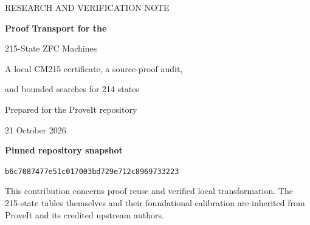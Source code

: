 \documentclass[11pt,letterpaper]{article}
\theoremstyle{definition}
\begin{document}
\begin{titlepage}
\vspace*{0.5in}
{\sffamily\large\color{teal}RESEARCH AND VERIFICATION NOTE\par}
\vspace{0.3in}
{\sffamily\bfseries\Huge\color{navy}Proof Transport for the\par
215-State ZFC Machines\par}
\vspace{0.25in}
{\Large A local CM215 certificate, a source-proof audit,\par
and bounded searches for 214 states\par}
\vspace{0.4in}
{\large Prepared for the ProveIt repository\par}
{\large 21 October 2026\par}
\vspace{0.35in}
\begin{abstract}
The most useful simplification for a second verified 215-state machine is
to transfer correctness directly from the already calibrated K215 table.
The existing conditional-marker candidate CM215 changes six transition
rows and keeps the source program unchanged. We replace its history-based
explanation by a three-clause inductive tape invariant. Each old transition
then has an exact one- or three-step implementation, preserving the entire
tape and head at the comparison points. A reusable positive-block theorem
turns this single simulation into halting equivalence in both directions.

The accompanying artifacts include the generic theorem checked in Lean
4.32.0 and Coq 8.18.0, the concrete Lean CM215 development, literal machine
tables, finite checks, and an interface to the repository's dense-machine
semantics. They separate new checks from the retained K215 calibration.
The current repository already incorporates three proof-simplification
phases; this report credits those changes and identifies the remaining
source-certificate opportunity: 2,240 zero-offset checkpoints use only 32
local arithmetic-effect signatures, and their labelled graph has a checked
1,423-class quotient.

No verified 214-state machine was obtained. Completed searches evaluate
17,708,928 fold specifications across fourteen literal tables and two
initial domains, plus 159,509,360 individual branch specifications in a
second restricted family. None survives the stated finite-window filters.
These are reproducible search boundaries, not state lower bounds.
\end{abstract}
\vfill
\textbf{Pinned repository snapshot}\par
\small\texttt{b6c7087477e51c017003bd729e712c8969733223}\par
\normalsize This contribution concerns proof reuse and verified local
transformation. The 215-state tables themselves and their foundational
calibration are inherited from ProveIt and its credited upstream authors.
\end{titlepage}
\end{document}
